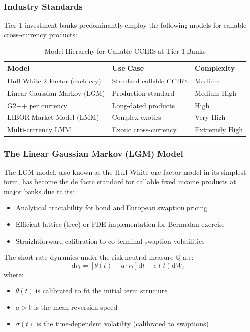 \documentclass[conference]{IEEEtran}
\theoremstyle{definition}
\newcommand{\Q}{\mathbb{Q}}
\newcommand{\diff}{\mathrm{d}}
\begin{document}
\subsubsection{Industry Standards}

Tier-1 investment banks predominantly employ the following models for callable cross-currency products:

\begin{table}[ht]
\centering
\caption{Model Hierarchy for Callable CCIRS at Tier-1 Banks}
\label{tab:models}
\begin{tabularx}{\columnwidth}{>{\raggedright\arraybackslash}X>{\raggedright\arraybackslash}Xl}
\toprule
\textbf{Model} & \textbf{Use Case} & \textbf{Complexity} \\
\midrule
Hull-White 2-Factor (each ccy) & Standard callable CCIRS & Medium \\
Linear Gaussian Markov (LGM) & Production standard & Medium-High \\
G2++ per currency & Long-dated products & High \\
LIBOR Market Model (LMM) & Complex exotics & Very High \\
Multi-currency LMM & Exotic cross-currency & Extremely High \\
\bottomrule
\end{tabularx}
\end{table}

\subsubsection{The Linear Gaussian Markov (LGM) Model}

The LGM model, also known as the Hull-White one-factor model in its simplest form, has become the de facto standard for callable fixed income products at major banks due to its:

\begin{itemize}
    \item Analytical tractability for bond and European swaption pricing
    \item Efficient lattice (tree) or PDE implementation for Bermudan exercise
    \item Straightforward calibration to co-terminal swaption volatilities
\end{itemize}

The short rate dynamics under the risk-neutral measure $\Q$ are:
\begin{equation}
\diff r_t = [\theta(t) - a \cdot r_t] \diff t + \sigma(t) \diff W_t
\end{equation}
where:
\begin{itemize}
    \item $\theta(t)$ is calibrated to fit the initial term structure
    \item $a > 0$ is the mean-reversion speed
    \item $\sigma(t)$ is the time-dependent volatility (calibrated to swaptions)
\end{itemize}
\end{document}
